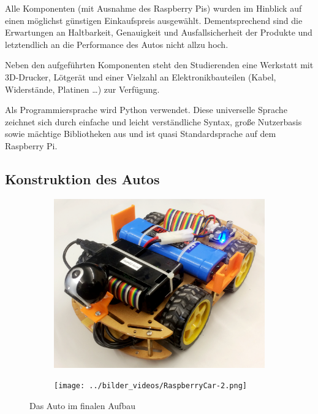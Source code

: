 \documentclass[a4paper, 12pt]{scrartcl}
\begin{document}
Alle Komponenten (mit Ausnahme des Raspberry Pis) wurden im Hinblick auf einen möglichst günstigen Einkaufspreis ausgewählt. Dementsprechend sind die Erwartungen an Haltbarkeit, Genauigkeit und Ausfallsicherheit der Produkte und letztendlich an die Performance des Autos nicht allzu hoch.

Neben den aufgeführten Komponenten steht den Studierenden eine Werkstatt mit 3D-Drucker, Lötgerät und einer Vielzahl an Elektronikbauteilen (Kabel, Widerstände, Platinen \ldots) zur Verfügung.

Als Programmiersprache wird Python verwendet. Diese universelle Sprache zeichnet sich durch einfache und leicht verständliche Syntax, große Nutzerbasis sowie mächtige Bibliotheken aus und ist quasi Standardsprache auf dem Raspberry Pi.

\subsection{Konstruktion des Autos}

\begin{figure}[H] 
	\centering
	\begin{subfigure}{.5\textwidth} 
		\centering
		\includegraphics[width=\textwidth]{../bilder_videos/RaspberryCar.png}
	\end{subfigure}%
	\begin{subfigure}{.5\textwidth} 
		\centering
		\texttt{[image: ../bilder\_videos/RaspberryCar-2.png]}
	\end{subfigure}%
	\caption{Das Auto im finalen Aufbau}
	\label{auto}
\end{figure}
\end{document}
